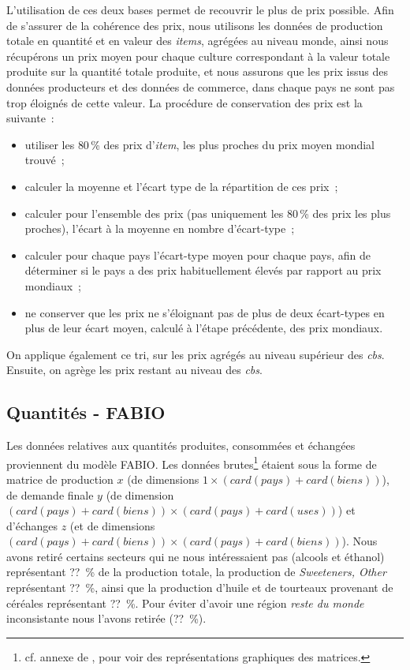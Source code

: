 L'utilisation de ces deux bases permet de recouvrir le plus de prix possible. Afin de s'assurer de la cohérence des prix, nous utilisons les données de production totale en quantité et en valeur des \textit{items}, agrégées au niveau monde, ainsi nous récupérons un prix moyen pour chaque culture correspondant à la valeur totale produite sur la quantité totale produite, et nous assurons que les prix issus des données producteurs et des données de commerce, dans chaque pays ne sont pas trop éloignés de cette valeur. La procédure de conservation des prix est la suivante~:
\begin{itemize}
    \item utiliser les {80\,\%} des prix d'\textit{item}, les plus proches du prix moyen mondial trouvé~;
    \item calculer la moyenne et l'écart type de la répartition de ces prix~;
    \item calculer pour l'ensemble des prix (pas uniquement les 80\,\% des prix les plus proches), l'écart à la moyenne en nombre d’écart-type~;
    \item calculer pour chaque pays l'écart-type moyen pour chaque pays, afin de déterminer si le pays a des prix habituellement élevés par rapport au prix mondiaux~;
    \item ne conserver que les prix ne s'éloignant pas de plus de deux écart-types en plus de leur écart moyen, calculé à l'étape précédente, des prix mondiaux.
\end{itemize}
On applique également ce tri, sur les prix agrégés au niveau supérieur des \textit{cbs}. Ensuite, on agrège les prix restant au niveau des \textit{cbs}.



\subsection{Quantités - FABIO}

Les données relatives aux quantités produites, consommées et échangées proviennent du modèle FABIO. Les données brutes\footnote{cf. annexe de \cite{Bruckner2019}, pour voir des représentations graphiques des matrices.} étaient sous la forme de matrice de production $x$ (de dimensions $1 \times (card(pays)+card(biens))$), de demande finale $y$ (de dimension $(card(pays)+card(biens)) \times (card(pays)+card(uses))$) et d'échanges $z$ (et de dimensions $(card(pays)+card(biens)) \times (card(pays)+card(biens))$). Nous avons retiré certains secteurs qui ne nous intéressaient pas (alcools et éthanol) représentant ??~\% de la production totale, la production de \textit{Sweeteners, Other} représentant ??~\%, ainsi que la production d'huile et de tourteaux provenant de céréales représentant ??~\%. Pour éviter d'avoir une région \textit{reste du monde} inconsistante nous l'avons retirée (??~\%).

